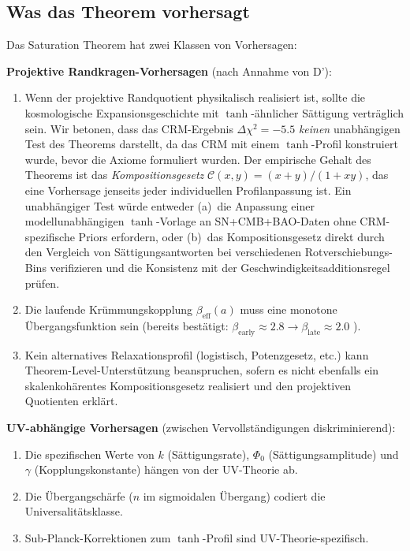 \documentclass[aps,prd,twocolumn,superscriptaddress,nofootinbib]{revtex4-2}
\begin{document}
\subsection{Was das Theorem vorhersagt}

Das Saturation Theorem hat zwei Klassen von Vorhersagen:

\textbf{Projektive Randkragen-Vorhersagen} (nach Annahme von D'):
\begin{enumerate}
\item Wenn der projektive Randquotient physikalisch realisiert ist, sollte die kosmologische Expansionsgeschichte mit $\tanh$-ähnlicher Sättigung verträglich sein. Wir betonen, dass das CRM-Ergebnis $\Delta\chi^2 = -5.5$ \cite{Geiger2026b} \textit{keinen} unabhängigen Test des Theorems darstellt, da das CRM mit einem $\tanh$-Profil konstruiert wurde, bevor die Axiome formuliert wurden. Der empirische Gehalt des Theorems ist das \textit{Kompositionsgesetz} $\mathcal{C}(x,y) = (x+y)/(1+xy)$, das eine Vorhersage jenseits jeder individuellen Profilanpassung ist. Ein unabhängiger Test würde entweder (a)~die Anpassung einer modellunabhängigen $\tanh$-Vorlage an SN+CMB+BAO-Daten ohne CRM-spezifische Priors erfordern, oder (b)~das Kompositionsgesetz direkt durch den Vergleich von Sättigungsantworten bei verschiedenen Rotverschiebungs-Bins verifizieren und die Konsistenz mit der Geschwindigkeitsadditionsregel prüfen.
\item Die laufende Krümmungskopplung $\beta_{\mathrm{eff}}(a)$ muss eine monotone Übergangsfunktion sein (bereits bestätigt: $\beta_{\mathrm{early}} \approx 2.8 \to \beta_{\mathrm{late}} \approx 2.0$ \cite{Geiger2026b}).
\item Kein alternatives Relaxationsprofil (logistisch, Potenzgesetz, etc.) kann Theorem-Level-Unterstützung beanspruchen, sofern es nicht ebenfalls ein skalenkohärentes Kompositionsgesetz realisiert und den projektiven Quotienten erklärt.
\end{enumerate}

\textbf{UV-abhängige Vorhersagen} (zwischen Vervollständigungen diskriminierend):
\begin{enumerate}
\item Die spezifischen Werte von $k$ (Sättigungsrate), $\Phi_0$ (Sättigungsamplitude) und $\gamma$ (Kopplungskonstante) hängen von der UV-Theorie ab.
\item Die Übergangschärfe ($n$ im sigmoidalen Übergang) codiert die Universalitätsklasse.
\item Sub-Planck-Korrektionen zum $\tanh$-Profil sind UV-Theorie-spezifisch.
\end{enumerate}
\end{document}
